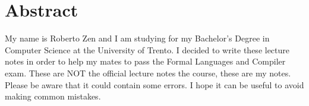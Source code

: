 \chapter*{Abstract}
My name is Roberto Zen and I am studying for my Bachelor’s Degree in Computer Science at the University of Trento. I decided to write these lecture notes in order to help my mates to pass the Formal Languages and Compiler exam. These are NOT the official lecture notes the course, these are my notes. Please be aware that it could contain some errors. I hope it can be useful to avoid making common mistakes.